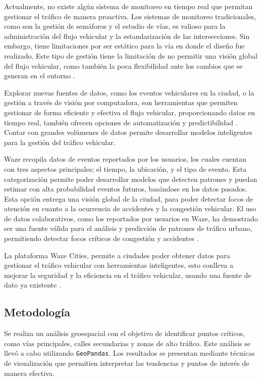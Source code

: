 \documentclass[12pt]{article}
\begin{document}
Actualmente, no existe algún sistema de monitoreo en tiempo real que permitan gestionar el tráfico de manera proactiva. Los sistemas de monitoreo tradicionales, como son la gestión de semáforos y el estudio de vías, es valioso para la administración del flujo vehicular y la estandarización de las intersecciones. Sin embargo, tiene limitaciones por ser estático para la vía en donde el diseño fue realizado. Este tipo de gestión tiene la limitación de no permitir una visión global del flujo vehicular, como también la poca flexibilidad ante los cambios que se generan en el entorno \citep{auld2009}.

Explorar nuevas fuentes de datos, como los eventos vehiculares en la ciudad, o la gestión a través de visión por computadora, son herramientas que permiten gestionar de forma eficiente y efectiva el flujo vehicular, proporcionando datos en tiempo real, también ofrecen opciones de automatización y predictibilidad \citep{chen2015}. Contar con grandes volúmenes de datos permite desarrollar modelos inteligentes para la gestión del tráfico vehicular.

Waze recopila datos de eventos reportados por los usuarios, los cuales cuentan con tres aspectos principales; el tiempo, la ubicación, y el tipo de evento. Esta categorización permite poder desarrollar modelos que detecten patrones y puedan estimar con alta probabilidad eventos futuros, basándose en los datos pasados. Esta opción entrega una visión global de la ciudad, para poder detectar focos de atención en cuanto a la ocurrencia de accidentes y la congestión vehicular. El uso de datos colaborativos, como los reportados por usuarios en Waze, ha demostrado ser una fuente válida para el análisis y predicción de patrones de tráfico urbano, permitiendo detectar focos críticos de congestión y accidentes \citep{ferreira2017waze}.

La plataforma Waze Cities, permite a ciudades poder obtener datos para gestionar el tráfico vehicular con herramientas inteligentes, esto conlleva a mejorar la seguridad y la eficiencia en el tráfico vehicular, usando una fuente de dato ya existente \citep{wazecitiescasestudies2024}.

\subsection{Metodología}

Se realiza un análisis geoespacial con el objetivo de identificar puntos críticos, como vías principales, calles secundarias y zonas de alto tráfico. Este análisis se llevó a cabo utilizando \texttt{GeoPandas}. Los resultados se presentan mediante técnicas de visualización que permitien interpretar las tendencias y puntos de interés de manera efectiva.
\end{document}
